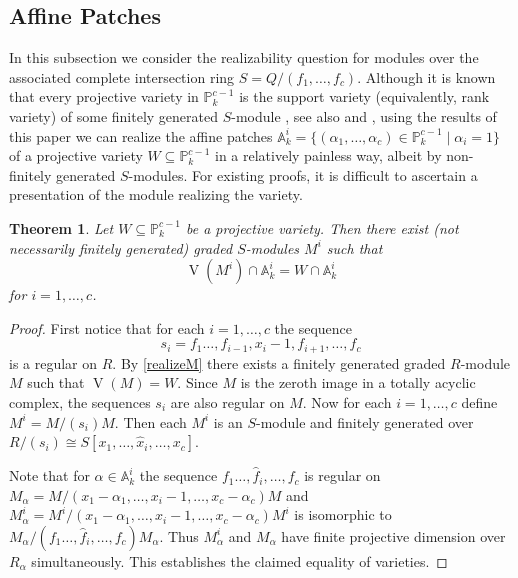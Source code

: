 \documentclass{amsart}[11pt]
\newcommand{\V}{\operatorname{V}}
\numberwithin{equation}{section}
\theoremstyle{plain}
\newtheorem{theorem}{Theorem}[section]
\newtheorem*{Main Theorem}{Main Theorem}
\theoremstyle{definition}
\theoremstyle{remark}
\numberwithin{equation}{theorem}
\begin{document}
\subsection{Affine Patches} In this subsection we consider the realizability question for modules over the associated complete intersection ring $S=Q/(f_1,\dots,f_c)$. Although it is known that every projective variety in $\mathbb P^{c-1}_k$ is the support variety (equivalently, rank variety) of some finitely generated $S$-module \cite{Bergh}, see also \cite{AJ} and \cite{AI}, using the results of this paper we can realize the affine patches 
$\mathbb A^i_k=\{(\alpha_1,\dots,\alpha_c)\in\mathbb P^{c-1}_k\mid \alpha_i=1\}$
of a projective variety $W\subseteq\mathbb P^{c-1}_k$ in a relatively painless way, albeit by non-finitely generated $S$-modules. For existing proofs, it is difficult to ascertain a presentation of the module realizing the variety.

\begin{theorem} Let $W\subseteq\mathbb P^{c-1}_k$ be a projective variety. Then there exist (not
necessarily finitely generated) graded $S$-modules $M^i$ such that 
\[
\V(M^i)\cap\mathbb A^i_k=W\cap\mathbb A^i_k
\]
for $i=1,\dots,c$.
\end{theorem}

\begin{proof} First notice that for each $i=1,\dots,c$ the sequence 
\[
s_i=f_1\dots,f_{i-1},x_i-1,f_{i+1},\dots,f_c
\] 
is a regular on $R$. By \ref{realizeM} there exists a finitely generated graded $R$-module $M$ such that $\V(M)=W$. Since $M$ is the zeroth image in a 
totally acyclic complex, the sequences $s_i$ are also regular on $M$. Now for each 
$i=1,\dots,c$ define $M^i=M/(s_i)M$.  Then each $M^i$ is an $S$-module and finitely 
generated over $R/(s_i)\cong S[x_1,\dots,\widehat x_i,\dots,x_c]$. 

Note that for $\alpha\in\mathbb A^i_k$ the sequence $f_1\dots,\widehat f_i,\dots,f_c$ is regular on 
$M_\alpha=M/(x_1-\alpha_1,\dots,x_i-1,\dots,x_c-\alpha_c)M$ and $M^i_\alpha=M^i/(x_1-\alpha_1,\dots,x_i-1,\dots,x_c-\alpha_c)M^i$ is isomorphic to $M_\alpha/(f_1\dots,\widehat f_i,\dots,f_c)M_\alpha$.  Thus $M^i_\alpha$ and $M_\alpha$ have finite projective dimension over $R_\alpha$ simultaneously.  This establishes the claimed equality of varieties. 
\end{proof}
\end{document}
